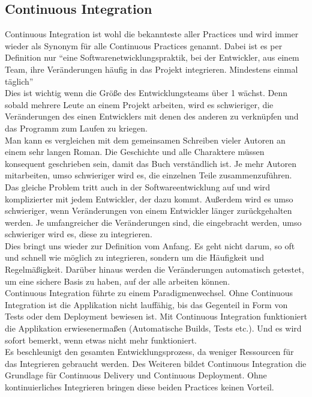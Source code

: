 \subsection{Continuous Integration}
Continuous Integration ist wohl die bekannteste aller Practices und wird immer wieder als Synonym für alle Continuous Practices genannt.\autocite[Vgl.][S.12]{Stahl.2018} Dabei ist es per Definition nur \enquote{eine Softwarenetwicklungspraktik, bei der Entwickler, aus einem Team, ihre Veränderungen häufig in das Projekt integrieren. Mindestens einmal täglich}\autocite[S.12]{Stahl.2018}\\
Dies ist wichtig wenn die Größe des Entwicklungsteams über 1 wächst. Denn sobald mehrere Leute an einem Projekt arbeiten, wird es schwieriger, die Veränderungen des einen Entwicklers mit denen des anderen zu verknüpfen und das Programm zum Laufen zu kriegen.\autocite[Vgl.][S.4]{Stahl.2018}\\ Man kann es vergleichen mit dem gemeinsamen Schreiben vieler Autoren an einem sehr langen Roman. Die Geschichte und alle Charaktere müssen konsequent geschrieben sein, damit das Buch verständlich ist. Je mehr Autoren mitarbeiten, umso schwieriger wird es, die einzelnen Teile zusammenzuführen.\\ Das gleiche Problem tritt auch in der Softwareentwicklung auf und wird komplizierter mit jedem Entwickler, der dazu kommt. Außerdem wird es umso schwieriger, wenn Veränderungen von einem Entwickler länger zurückgehalten werden. Je umfangreicher die Veränderungen sind, die eingebracht werden, umso schwieriger wird es, diese zu integrieren.\\ Dies bringt uns wieder zur Definition vom Anfang. Es geht nicht darum, so oft und schnell wie möglich zu integrieren, sondern um die Häufigkeit und Regelmäßigkeit.\autocite[Vgl.][S.3]{Stahl.2018} Darüber hinaus werden die Veränderungen automatisch getestet, um eine sichere Basis zu haben, auf der alle arbeiten können.\\ Continuous Integration führte zu einem Paradigmenwechsel. Ohne Continuous Integration ist die Applikation nicht lauffähig, bis das Gegenteil in Form von Tests oder dem Deployment bewiesen ist. Mit Continuous Integration funktioniert die Applikation erwiesenermaßen (Automatische Builds, Tests etc.). Und es wird sofort bemerkt, wenn etwas nicht mehr funktioniert.\autocite[Vgl.][S.40]{Farley.2010}\\ Es beschleunigt den gesamten Entwicklungsprozess, da weniger Ressourcen für das Integrieren gebraucht werden. Des Weiteren bildet Continuous Integration die Grundlage für Continuous Delivery und Continuous Deployment. Ohne kontinuierliches Integrieren bringen diese beiden Practices keinen Vorteil.\autocite[Vgl.][S.7]{Stahl.2018}
